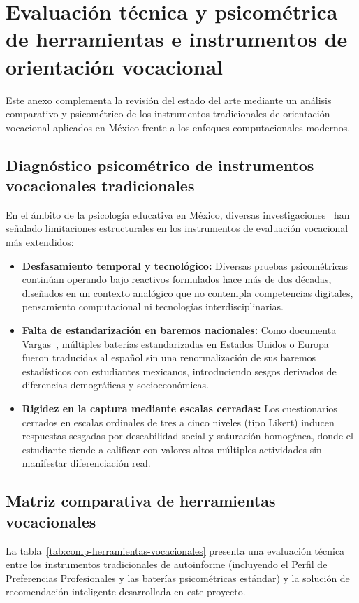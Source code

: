 \chapter{Evaluación técnica y psicométrica de herramientas e instrumentos de orientación vocacional}\label{anexo:herramientas}

Este anexo complementa la revisión del estado del arte mediante un análisis comparativo y psicométrico de los instrumentos tradicionales de orientación vocacional aplicados en México frente a los enfoques computacionales modernos.

\section{Diagnóstico psicométrico de instrumentos vocacionales tradicionales}
En el ámbito de la psicología educativa en México, diversas investigaciones~\cite{GarciaMartinez2021,Vargas2026} han señalado limitaciones estructurales en los instrumentos de evaluación vocacional más extendidos:
\begin{itemize}
    \item \textbf{Desfasamiento temporal y tecnológico:} Diversas pruebas psicométricas continúan operando bajo reactivos formulados hace más de dos décadas, diseñados en un contexto analógico que no contempla competencias digitales, pensamiento computacional ni tecnologías interdisciplinarias.
    \item \textbf{Falta de estandarización en baremos nacionales:} Como documenta Vargas~\cite{Vargas2026}, múltiples baterías estandarizadas en Estados Unidos o Europa fueron traducidas al español sin una renormalización de sus baremos estadísticos con estudiantes mexicanos, introduciendo sesgos derivados de diferencias demográficas y socioeconómicas.
    \item \textbf{Rigidez en la captura mediante escalas cerradas:} Los cuestionarios cerrados en escalas ordinales de tres a cinco niveles (tipo Likert) inducen respuestas sesgadas por deseabilidad social y saturación homogénea, donde el estudiante tiende a calificar con valores altos múltiples actividades sin manifestar diferenciación real.
\end{itemize}

\section{Matriz comparativa de herramientas vocacionales}
La tabla~\ref{tab:comp-herramientas-vocacionales} presenta una evaluación técnica entre los instrumentos tradicionales de autoinforme (incluyendo el Perfil de Preferencias Profesionales y las baterías psicométricas estándar) y la solución de recomendación inteligente desarrollada en este proyecto.

